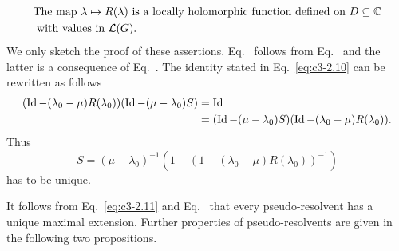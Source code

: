 \begin{equation}\label{eq:c3-2.12}
	\begin{split}
	&\text{The map $\lambda \mapsto R(\lambda)$ is a locally holomorphic function defined on  $D \subseteq \mathbb{C} $}\\ 
	&\text{ with values in  $\mathcal{L}(G)$} .
	\end{split}
\end{equation}
We only sketch the proof of these assertions. Eq.~ follows from Eq.~ and the latter is a consequence of Eq.~.
The identity stated in Eq.~\eqref{eq:c3-2.10} can be rewritten as follows
\begin{align*}
(\operatorname{Id}-(\lambda_{0}-\mu)R(\lambda_{0}))(\operatorname{Id}-(\mu-\lambda_{0})S) & = \operatorname{Id} \\
& = (\operatorname{Id}-(\mu-\lambda_{0})S)(\operatorname{Id}-(\lambda_{0}-\mu)R(\lambda_{0})).
\end{align*}
Thus 
%
\[
	S = (\mu-\lambda_{0})^{-1}(1 - (1-(\lambda_{0}-\mu)R(\lambda_{0}))^{-1})
\]
%
has to be unique.

It follows from Eq.~\eqref{eq:c3-2.11} and Eq.~ that every pseudo-resolvent has a unique maximal extension.
Further properties of pseudo-resolvents are given in the following two propositions.


